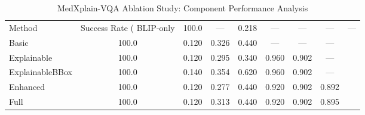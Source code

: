 \begin{table}
\caption{MedXplain-VQA Ablation Study: Component Performance Analysis}
\label{tab:medxplain_ablation_study}
\begin{tabular}{l|c|c|c|c|c|c|c}
\toprule
Method & Success Rate (%
\midrule
BLIP-only & 100.0 & — & 0.218 & — & — & — & — \\
Basic & 100.0 & 0.120 & 0.326 & 0.440 & — & — & — \\
Explainable & 100.0 & 0.120 & 0.295 & 0.340 & 0.960 & 0.902 & — \\
ExplainableBBox & 100.0 & 0.140 & 0.354 & 0.620 & 0.960 & 0.902 & — \\
Enhanced & 100.0 & 0.120 & 0.277 & 0.440 & 0.920 & 0.902 & 0.892 \\
Full & 100.0 & 0.120 & 0.313 & 0.440 & 0.920 & 0.902 & 0.895 \\
\bottomrule
\end{tabular}
\end{table}

